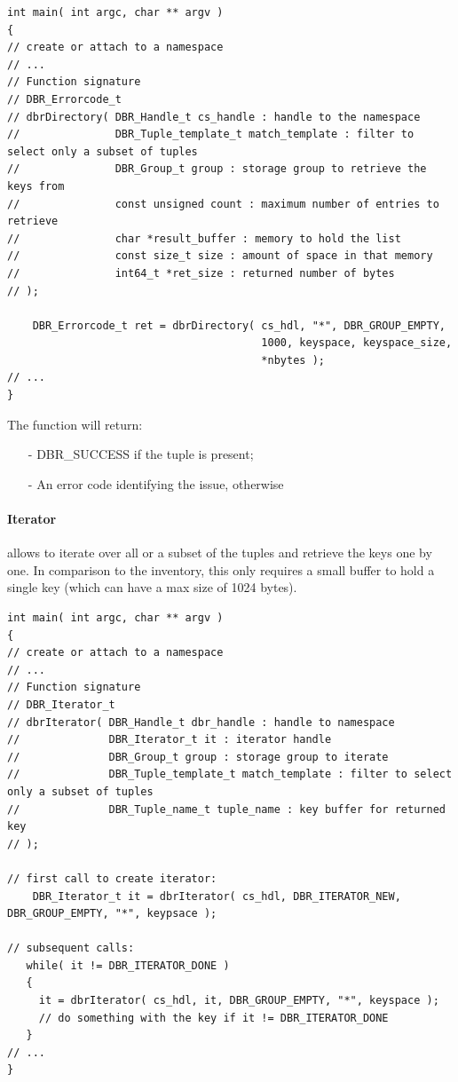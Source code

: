 \begin{lstlisting}[style=mystyle,basicstyle=\scriptsize\ttfamily,caption=List
  the currently available tuples., label=code:dbrDirectory]
int main( int argc, char ** argv )
{
// create or attach to a namespace
// ...
// Function signature
// DBR_Errorcode_t
// dbrDirectory( DBR_Handle_t cs_handle : handle to the namespace
//               DBR_Tuple_template_t match_template : filter to select only a subset of tuples
//               DBR_Group_t group : storage group to retrieve the keys from
//               const unsigned count : maximum number of entries to retrieve
//               char *result_buffer : memory to hold the list
//               const size_t size : amount of space in that memory
//               int64_t *ret_size : returned number of bytes
// );

	DBR_Errorcode_t ret = dbrDirectory( cs_hdl, "*", DBR_GROUP_EMPTY,
                                        1000, keyspace, keyspace_size,
                                        *nbytes );
// ...
}
\end{lstlisting}


The function will return:
\begin{itemize}
	\item[-] DBR\_SUCCESS if the tuple is present;
	\item[-] An error code identifying the issue, otherwise
\end{itemize}



\paragraph{Iterator} allows to iterate over all or a subset of the
tuples and retrieve the keys one by one.  In comparison to the
inventory, this only requires a small buffer to hold a single key
(which can have a max size of 1024 bytes).

\begin{lstlisting}[style=mystyle,basicstyle=\scriptsize\ttfamily,caption=List
  the currently available tuples., label=code:dbrIterator]
int main( int argc, char ** argv )
{
// create or attach to a namespace
// ...
// Function signature
// DBR_Iterator_t
// dbrIterator( DBR_Handle_t dbr_handle : handle to namespace
//              DBR_Iterator_t it : iterator handle
//              DBR_Group_t group : storage group to iterate
//              DBR_Tuple_template_t match_template : filter to select only a subset of tuples
//              DBR_Tuple_name_t tuple_name : key buffer for returned key
// );

// first call to create iterator:
	DBR_Iterator_t it = dbrIterator( cs_hdl, DBR_ITERATOR_NEW, DBR_GROUP_EMPTY, "*", keypsace );

// subsequent calls:
   while( it != DBR_ITERATOR_DONE )
   {
     it = dbrIterator( cs_hdl, it, DBR_GROUP_EMPTY, "*", keyspace );
     // do something with the key if it != DBR_ITERATOR_DONE
   }
// ...
}
\end{lstlisting}

